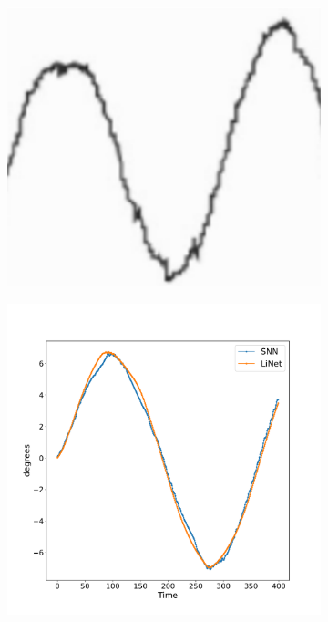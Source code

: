 \documentclass [MS] {UCLAthesis}
\begin{document}
\begin{figure}
    \centering

    \begin{subfigure}{0.3\textwidth}
        \centering
        \includegraphics[width=\textwidth]{smooth_lateral_human}
        \caption{}
        \label{fig:smooth_lateral_human}
    \end{subfigure}
    \hfill
    \begin{subfigure}{0.3\textwidth}
        \centering
        \includegraphics[width=\textwidth]{smooth_lateral_normal}

\end{subfigure}
\end{figure}
\end{document}
